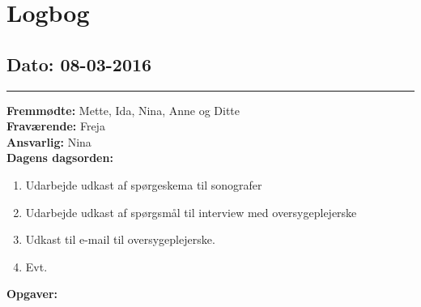 \chapter{Logbog}
\section{Dato: 08-03-2016}
\hrule
\textbf{Fremmødte:} Mette, Ida, Nina, Anne og Ditte \\
\textbf{Fraværende:} Freja \\
\textbf{Ansvarlig: }Nina  \\
\textbf{Dagens dagsorden: }
\begin{enumerate}
	\item Udarbejde udkast af spørgeskema til sonografer
	\item Udarbejde udkast af spørgsmål til interview med oversygeplejerske
	\item Udkast til e-mail til oversygeplejerske.
	\item Evt. 
\end{enumerate}

\textbf{Opgaver:} \newline

